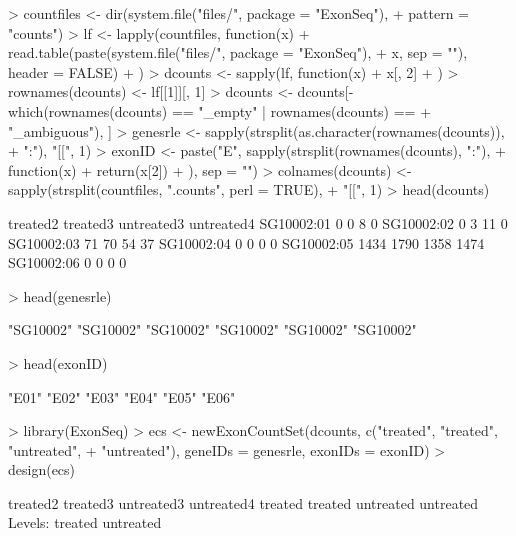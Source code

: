 \documentclass{article}
\begin{document}
\begin{Schunk}
\begin{Sinput}
> countfiles <- dir(system.file("files/", package = "ExonSeq"), 
+     pattern = "counts")
> lf <- lapply(countfiles, function(x) {
+     read.table(paste(system.file("files/", package = "ExonSeq"), 
+         x, sep = ""), header = FALSE)
+ })
> dcounts <- sapply(lf, function(x) {
+     x[, 2]
+ })
> rownames(dcounts) <- lf[[1]][, 1]
> dcounts <- dcounts[-which(rownames(dcounts) == "_empty" | rownames(dcounts) == 
+     "_ambiguous"), ]
> genesrle <- sapply(strsplit(as.character(rownames(dcounts)), 
+     ":"), "[[", 1)
> exonID <- paste("E", sapply(strsplit(rownames(dcounts), ":"), 
+     function(x) {
+         return(x[2])
+     }), sep = "")
> colnames(dcounts) <- sapply(strsplit(countfiles, ".counts", perl = TRUE), 
+     "[[", 1)
> head(dcounts)
\end{Sinput}
\begin{Soutput}
           treated2 treated3 untreated3 untreated4
SG10002:01        0        0          8          0
SG10002:02        0        3         11          0
SG10002:03       71       70         54         37
SG10002:04        0        0          0          0
SG10002:05     1434     1790       1358       1474
SG10002:06        0        0          0          0
\end{Soutput}
\begin{Sinput}
> head(genesrle)
\end{Sinput}
\begin{Soutput}
[1] "SG10002" "SG10002" "SG10002" "SG10002" "SG10002" "SG10002"
\end{Soutput}
\begin{Sinput}
> head(exonID)
\end{Sinput}
\begin{Soutput}
[1] "E01" "E02" "E03" "E04" "E05" "E06"
\end{Soutput}
\begin{Sinput}
> library(ExonSeq)
> ecs <- newExonCountSet(dcounts, c("treated", "treated", "untreated", 
+     "untreated"), geneIDs = genesrle, exonIDs = exonID)
> design(ecs)
\end{Sinput}
\begin{Soutput}
  treated2   treated3 untreated3 untreated4 
   treated    treated  untreated  untreated 
Levels: treated untreated
\end{Soutput}
\end{Schunk}
\normalsize
\end{document}

